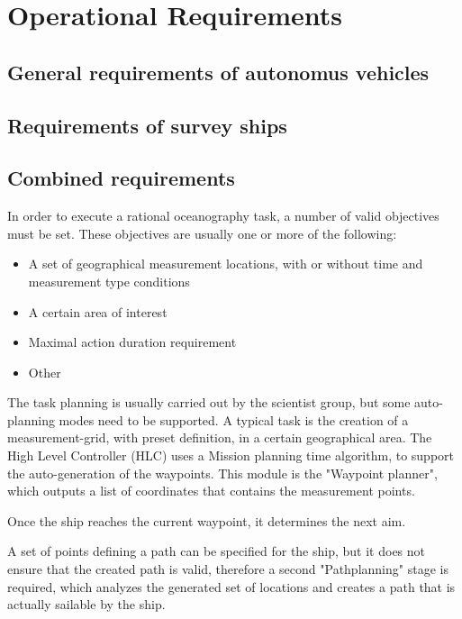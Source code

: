 \section{Operational Requirements}

\subsection{General requirements of autonomus vehicles}

\subsection{Requirements of survey ships}

\subsection{Combined requirements}

In order to execute a rational oceanography task, a number of valid objectives must be set. These objectives are usually one or more of the following\cite{oceanography}:

\begin{itemize}
\item A set of geographical measurement locations, with or without time and measurement type conditions
\item A certain area of interest
\item Maximal action duration requirement
\item Other
\end{itemize}

The task planning is usually carried out by the scientist group, but some auto-planning modes need to be supported. A typical task is the creation of a measurement-grid, with preset definition, in a certain geographical area. The High Level Controller (HLC) uses a Mission planning time algorithm, to support the auto-generation of the waypoints. This module is the "Waypoint planner", which outputs a list of coordinates that contains the measurement points.

Once the ship reaches the current waypoint, it determines the next aim.

A set of points defining a path can be specified for the ship, but it does not ensure that the created path is valid, therefore a second "Pathplanning" stage is required, which analyzes the generated set of locations and creates a path that is actually sailable by the ship.